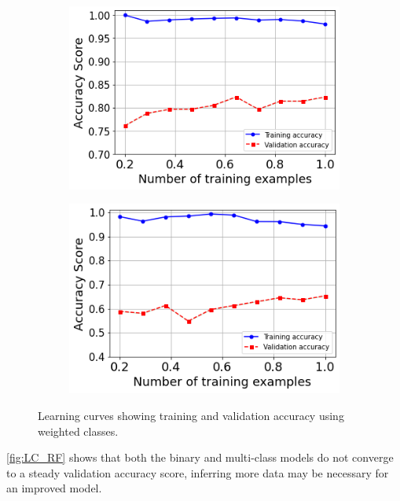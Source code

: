 \documentclass[conference]{IEEEtran}
\begin{document}
\begin{figure}[H]
\begin{subfigure}[t]{0.241\textwidth}
  \centering
    \includegraphics[width=\textwidth]{Figures/LC_binary.png}
    \label{fig:binLC}
\end{subfigure}
\begin{subfigure}[t]{0.241\textwidth}
    \centering
    \includegraphics[width=\textwidth]{Figures/LC_multi.png}
    \label{fig:multiLC}
\end{subfigure}
\caption{Learning curves showing training and validation accuracy using weighted classes.}
\label{fig:LC_RF}
\end{figure}

\autoref{fig:LC_RF} shows that both the binary and multi-class models do not converge to a steady validation accuracy score, inferring more data may be necessary for an improved model.
\end{document}
